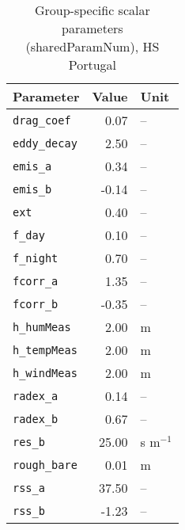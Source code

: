 \begin{table}[ht]
\centering
\caption{Group-specific scalar parameters (\textsf{sharedParamNum}), HS Portugal} 
\label{tab:portugalHS_sharedParamNum}
\begin{tabular}{lrl}
  \hline
Parameter & Value & Unit \\ 
  \hline
\verb!drag_coef! & 0.07 & -- \\ 
  \verb!eddy_decay! & 2.50 & -- \\ 
  \verb!emis_a! & 0.34 & -- \\ 
  \verb!emis_b! & -0.14 & -- \\ 
  \verb!ext! & 0.40 & -- \\ 
  \verb!f_day! & 0.10 & -- \\ 
  \verb!f_night! & 0.70 & -- \\ 
  \verb!fcorr_a! & 1.35 & -- \\ 
  \verb!fcorr_b! & -0.35 & -- \\ 
  \verb!h_humMeas! & 2.00 & m \\ 
  \verb!h_tempMeas! & 2.00 & m \\ 
  \verb!h_windMeas! & 2.00 & m \\ 
  \verb!radex_a! & 0.14 & -- \\ 
  \verb!radex_b! & 0.67 & -- \\ 
  \verb!res_b! & 25.00 & s m$^{-1}$ \\ 
  \verb!rough_bare! & 0.01 & m \\ 
  \verb!rss_a! & 37.50 & -- \\ 
  \verb!rss_b! & -1.23 & -- \\ 
   \hline
\end{tabular}
\end{table}

